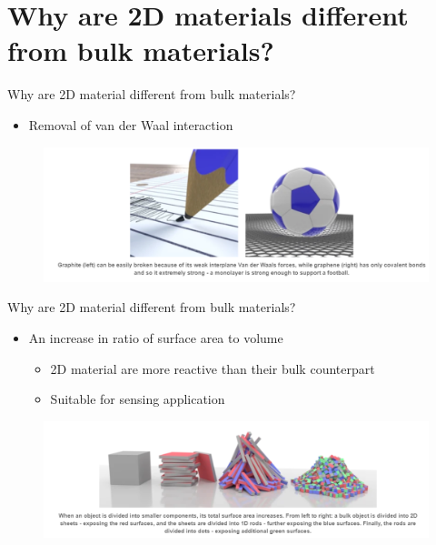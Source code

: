 \documentclass{beamer}
\begin{document}
\section{Why are 2D materials different from bulk materials?}

\begin{frame}{Why are 2D material different from bulk materials?}
    \begin{itemize}
        \item Removal of van der Waal interaction
    \end{itemize}
    \begin{figure}
        \centering
        \includegraphics[scale=0.5]{removal_of_van_der_Waal.PNG}
    \end{figure}
\end{frame}

\begin{frame}{Why are 2D material different from bulk materials?}
    \begin{itemize}
        \item An increase in ratio of surface area to volume
        \begin{itemize}
            \item 2D material are more reactive than their bulk counterpart
            \item Suitable for sensing application
        \end{itemize}
    \end{itemize}
    \begin{figure}
        \centering
        \includegraphics[scale=0.5]{increase_in_surface_area.PNG}
    \end{figure}
\end{frame}
\end{document}
